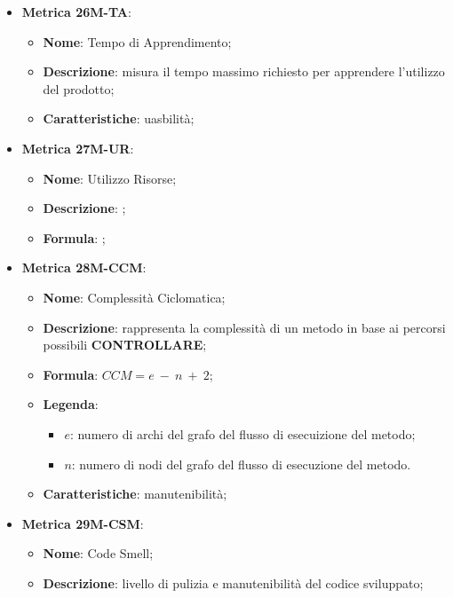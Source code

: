 \begin{itemize}
    \item \textbf{Metrica 26M-TA}:
    \begin{itemize}
        \item \textbf{Nome}: Tempo di Apprendimento;
        \item \textbf{Descrizione}: misura il tempo massimo richiesto per apprendere l'utilizzo del prodotto;
        \item \textbf{Caratteristiche}: uasbilità;
    \end{itemize}
\end{itemize}

\begin{itemize}
    \item \textbf{Metrica 27M-UR}:
    \begin{itemize}
        \item \textbf{Nome}: Utilizzo Risorse;
        \item \textbf{Descrizione}: ;
        \item \textbf{Formula}: ;
    \end{itemize}
\end{itemize}

\begin{itemize}
    \item \textbf{Metrica 28M-CCM}:
    \begin{itemize}
        \item \textbf{Nome}: Complessità Ciclomatica;
        \item \textbf{Descrizione}: rappresenta la complessità di un metodo in base ai percorsi possibili \textbf{CONTROLLARE};
        \item \textbf{Formula}: $CCM = e\: -\: n\: +\: 2$;
        \item \textbf{Legenda}: 
        \begin{itemize}
            \item $e$: numero di archi del grafo del flusso di esecuizione del metodo;
            \item $n$: numero di nodi del grafo del flusso di esecuzione del metodo.
        \end{itemize}
        \item \textbf{Caratteristiche}: manutenibilità;
    \end{itemize}
\end{itemize}

\begin{itemize}
    \item \textbf{Metrica 29M-CSM}:
    \begin{itemize}
        \item \textbf{Nome}: Code Smell;
        \item \textbf{Descrizione}: livello di pulizia e manutenibilità del codice sviluppato;
    \end{itemize}
\end{itemize}

